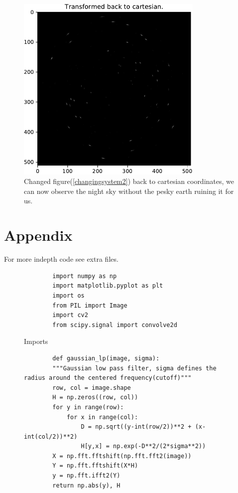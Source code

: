 {\begin{figure}[H]
    {\centering
        \includegraphics[width=0.8\textwidth]{carttopol_trans_back3.pdf}
        \caption{Changed figure(\ref{changingsystem2}) back to cartesian coordinates, we can now observe the night sky without the pesky earth ruining it for us.}
        \label{changingsystem3}
    \par}
    \end{figure}
    






\newpage
\clearpage
\section{Appendix}
For more indepth code see extra files.

\begin{figure}[H]
    \begin{lstlisting}
        import numpy as np 
        import matplotlib.pyplot as plt
        import os
        from PIL import Image
        import cv2
        from scipy.signal import convolve2d
    \end{lstlisting}
\caption{Imports}
\label{Imports}
\end{figure}


\begin{figure}[H]
    \begin{lstlisting}
        def gaussian_lp(image, sigma):
        """Gaussian low pass filter, sigma defines the radius around the centered frequency(cutoff)"""
        row, col = image.shape
        H = np.zeros((row, col))
        for y in range(row):
            for x in range(col):
                D = np.sqrt((y-int(row/2))**2 + (x-int(col/2))**2)
                H[y,x] = np.exp(-D**2/(2*sigma**2))
        X = np.fft.fftshift(np.fft.fft2(image))
        Y = np.fft.fftshift(X*H)
        y = np.fft.ifft2(Y)
        return np.abs(y), H


\end{lstlisting}
\end{figure}}
